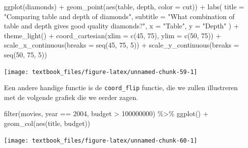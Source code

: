 \documentclass[]{tufte-book}
\newenvironment{Shaded}{}{}
\newcommand{\AttributeTok}[1]{\textcolor[rgb]{0.49,0.56,0.16}{#1}}
\newcommand{\DecValTok}[1]{\textcolor[rgb]{0.25,0.63,0.44}{#1}}
\newcommand{\FunctionTok}[1]{\textcolor[rgb]{0.02,0.16,0.49}{#1}}
\newcommand{\NormalTok}[1]{#1}
\newcommand{\SpecialCharTok}[1]{\textcolor[rgb]{0.25,0.44,0.63}{#1}}
\newcommand{\StringTok}[1]{\textcolor[rgb]{0.25,0.44,0.63}{#1}}
\begin{document}
\begin{Shaded}
\begin{Highlighting}[]
\FunctionTok{ggplot}\NormalTok{(diamonds) }\SpecialCharTok{+}
  \FunctionTok{geom\_point}\NormalTok{(}\FunctionTok{aes}\NormalTok{(table, depth, }\AttributeTok{color =}\NormalTok{ cut)) }\SpecialCharTok{+}
  \FunctionTok{labs}\NormalTok{(}
    \AttributeTok{title =} \StringTok{"Comparing table and depth of diamonds"}\NormalTok{,}
    \AttributeTok{subtitle =} \StringTok{"What combination of table}
\StringTok{         and depth gives good quality diamonds?"}\NormalTok{,}
    \AttributeTok{x =} \StringTok{"Table"}\NormalTok{,}
    \AttributeTok{y =} \StringTok{"Depth"}
\NormalTok{  ) }\SpecialCharTok{+}
  \FunctionTok{theme\_light}\NormalTok{() }\SpecialCharTok{+}
  \FunctionTok{coord\_cartesian}\NormalTok{(}\AttributeTok{xlim =} \FunctionTok{c}\NormalTok{(}\DecValTok{45}\NormalTok{, }\DecValTok{75}\NormalTok{), }\AttributeTok{ylim =} \FunctionTok{c}\NormalTok{(}\DecValTok{50}\NormalTok{, }\DecValTok{75}\NormalTok{)) }\SpecialCharTok{+}
  \FunctionTok{scale\_x\_continuous}\NormalTok{(}\AttributeTok{breaks =} \FunctionTok{seq}\NormalTok{(}\DecValTok{45}\NormalTok{, }\DecValTok{75}\NormalTok{, }\DecValTok{5}\NormalTok{)) }\SpecialCharTok{+}
  \FunctionTok{scale\_y\_continuous}\NormalTok{(}\AttributeTok{breaks =} \FunctionTok{seq}\NormalTok{(}\DecValTok{50}\NormalTok{, }\DecValTok{75}\NormalTok{, }\DecValTok{5}\NormalTok{))}
\end{Highlighting}
\end{Shaded}

\texttt{[image: textbook\_files/figure-latex/unnamed-chunk-59-1]}

Een andere handige functie is de \texttt{coord\_flip} functie, die we zullen illustreren met de volgende grafiek die we eerder zagen.

\begin{Shaded}
\begin{Highlighting}[]
\FunctionTok{filter}\NormalTok{(movies, year }\SpecialCharTok{==} \DecValTok{2004}\NormalTok{, budget }\SpecialCharTok{\textgreater{}} \DecValTok{100000000}\NormalTok{) }\SpecialCharTok{\%\textgreater{}\%}
  \FunctionTok{ggplot}\NormalTok{() }\SpecialCharTok{+}
  \FunctionTok{geom\_col}\NormalTok{(}\FunctionTok{aes}\NormalTok{(title, budget))}
\end{Highlighting}
\end{Shaded}

\texttt{[image: textbook\_files/figure-latex/unnamed-chunk-60-1]}
\end{document}

